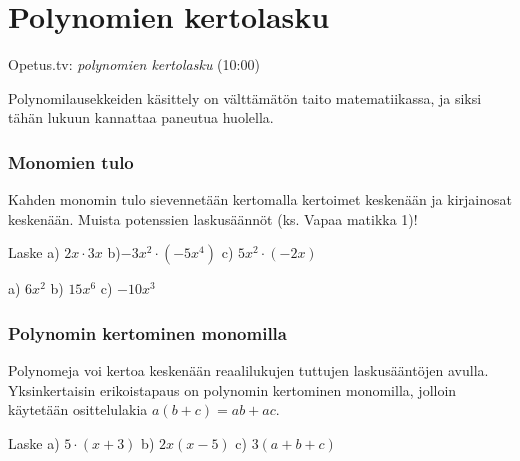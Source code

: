 \section{Polynomien kertolasku}

{Opetus.tv: \emph{polynomien kertolasku} (10:00)}

Polynomilausekkeiden käsittely on välttämätön taito matematiikassa, ja siksi tähän lukuun kannattaa paneutua huolella.

\subsubsection*{Monomien tulo}

Kahden monomin tulo sievennetään kertomalla kertoimet keskenään ja kirjainosat keskenään. Muista potenssien laskusäännöt (ks. Vapaa matikka 1)!

\begin{esimerkki}
    Laske \quad 
    a) $2x\cdot 3x$ \quad
    b)$-3x^2\cdot (-5x^4)$ \quad
    c) $5x^2 \cdot (-2x)$
    \begin{esimratk}
        \begin{alakohdat}
        \end{alakohdat}
    \end{esimratk}
    \begin{esimvast}
        a) $6x^2$ \quad
        b) $15x^6$ \quad
        c) $-10x^3$
    \end{esimvast}
\end{esimerkki}

\subsubsection*{Polynomin kertominen monomilla}

Polynomeja voi kertoa keskenään reaalilukujen tuttujen laskusääntöjen avulla. Yksinkertaisin erikoistapaus on polynomin kertominen monomilla, jolloin
käytetään osittelulakia $a(b+c)=ab+ac$.

\begin{esimerkki}
Laske \quad a) $5\cdot(x+3)$ \quad b) $2x(x-5)$ \quad 
c) $3(a+b+c)$
\begin{alakohdat}
\end{alakohdat}
\end{esimerkki} 


